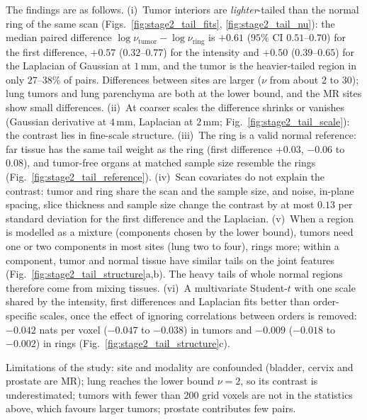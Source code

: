 \documentclass[fleqn,10pt]{olplainarticle}
\begin{document}
The findings are as follows. (i)~Tumor interiors are \emph{lighter}-tailed than the normal ring of the same scan
(Figs.~\ref{fig:stage2_tail_fits}, \ref{fig:stage2_tail_nu}): the median paired difference $\log\nu_{\mathrm{tumor}}-\log\nu_{\mathrm{ring}}$
is $+0.61$ ($95\%$ CI $0.51$--$0.70$) for the first difference, $+0.57$ ($0.32$--$0.77$) for the intensity and $+0.50$
($0.39$--$0.65$) for the Laplacian of Gaussian at $1$\,mm, and the tumor is the heavier-tailed region in only $27$--$38\%$ of
pairs. Differences between sites are larger ($\nu$ from about $2$ to $30$); lung tumors and lung parenchyma are both at the
lower bound, and the MR sites show small differences. (ii)~At coarser scales the difference shrinks or vanishes (Gaussian
derivative at $4$\,mm, Laplacian at $2$\,mm; Fig.~\ref{fig:stage2_tail_scale}): the contrast lies in fine-scale structure.
(iii)~The ring is a valid normal reference: far tissue has the same tail weight as the ring (first difference $+0.03$,
$-0.06$ to $0.08$), and tumor-free organs at matched sample size resemble the rings (Fig.~\ref{fig:stage2_tail_reference}).
(iv)~Scan covariates do not explain the contrast: tumor and ring share the scan and the sample size, and noise, in-plane
spacing, slice thickness and sample size change the contrast by at most $0.13$ per standard deviation for the first
difference and the Laplacian. (v)~When a region is modelled as a mixture (components chosen by the lower bound), tumors
need one or two components in most sites (lung two to four), rings more; within a component, tumor and normal tissue have
similar tails on the joint features (Fig.~\ref{fig:stage2_tail_structure}a,b). The heavy tails of whole normal regions
therefore come from mixing tissues. (vi)~A multivariate Student-$t$ with one scale shared by the intensity, first differences
and Laplacian fits better than order-specific scales, once the effect of ignoring correlations between orders is removed:
$-0.042$ nats per voxel ($-0.047$ to $-0.038$) in tumors and $-0.009$ ($-0.018$ to $-0.002$) in rings
(Fig.~\ref{fig:stage2_tail_structure}c).

Limitations of the study: site and modality are confounded (bladder, cervix and prostate are MR); lung reaches the lower bound
$\nu=2$, so its contrast is underestimated; tumors with fewer than $200$ grid voxels are not in the statistics above, which
favours larger tumors; prostate contributes few pairs.
\end{document}
